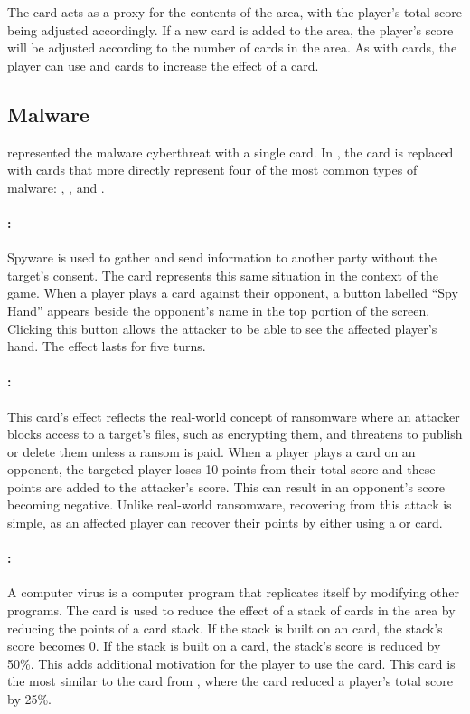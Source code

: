 The \M card acts as a proxy for the contents of the \MS area, with the player's total score being adjusted accordingly. If a new card is added to the \MS area, the player's score will be adjusted according to the number of \M cards in the \Play area.
As with \I cards, the player can use \R and \V cards to increase the effect of a \M card. 

\subsection{Malware}
\label{section:malware}

\pwOne represented the malware cyberthreat with a single \Mal card. In \pwTwoNS, the \Mal card is replaced with cards that more directly represent four of the most common types of malware: \Spyns, \Ranns, \Vi and \Trjns. 

\paragraph{\Spyns:}
Spyware is used to gather and send information to another party without the target’s consent. The \Spy card represents this same situation in the context of the game. When a player plays a \Spy card against their opponent, a button labelled ``Spy Hand'' appears beside the opponent's name in the top portion of the screen. Clicking this button allows the attacker to be able to see the affected player's hand. The effect lasts for five turns.

\paragraph{\Ranns:}
This card's effect reflects the real-world concept of ransomware where an attacker blocks access to a target's files, such as encrypting them, and threatens to publish or delete them unless a ransom is paid. When a player plays a \Ran card on an opponent, the targeted player loses 10 points from their total score and these points are added to the attacker's score. This can result in an opponent's score becoming negative. Unlike real-world ransomware, recovering from this attack is simple, as an affected player can recover their points by either using a \Scan or \Anti card. 

\paragraph{\Vins:}
A computer virus is a computer program that replicates itself by modifying other programs. The \Vi card is used to reduce the effect of a stack of cards in the \Play area by reducing the points of a card stack. If the stack is built on an \I card, the stack's score becomes 0. If the stack is built on a \M card, the stack's score is reduced by 50\%. This adds additional motivation for the player to use the \M card. This card is the most similar to the \Mal card from \pwOneNS, where the \Mal card reduced a player's total score by 25\%.   

